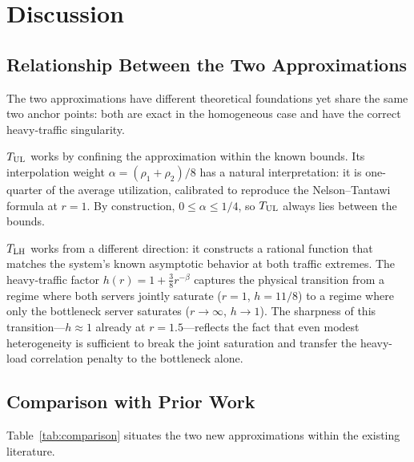 \section{Discussion}
\label{sec:discussion}

\subsection{Relationship Between the Two Approximations}

The two approximations have different theoretical foundations yet share the
same two anchor points: both are exact in the homogeneous case and have the
correct heavy-traffic singularity.

$T_{\text{UL}}$ works by confining the approximation within the known bounds.
Its interpolation weight $\alpha = (\rho_1+\rho_2)/8$ has a natural
interpretation: it is one-quarter of the average utilization, calibrated
to reproduce the Nelson--Tantawi formula at $r = 1$.
By construction, $0 \leq \alpha \leq 1/4$, so $T_{\text{UL}}$ always lies between
the bounds.

$T_{\text{LH}}$ works from a different direction: it constructs a rational function
that matches the system's known asymptotic behavior at both traffic extremes.
The heavy-traffic factor $h(r) = 1 + \tfrac{3}{8}r^{-\beta}$ captures the
physical transition from a regime where both servers jointly saturate
($r = 1$, $h = 11/8$) to a regime where only the bottleneck server saturates
($r \to \infty$, $h \to 1$).
The sharpness of this transition---$h \approx 1$ already at $r = 1.5$---reflects
the fact that even modest heterogeneity is sufficient to break the joint
saturation and transfer the heavy-load correlation penalty to the bottleneck
alone.

\subsection{Comparison with Prior Work}

Table~\ref{tab:comparison} situates the two new approximations within the
existing literature.

